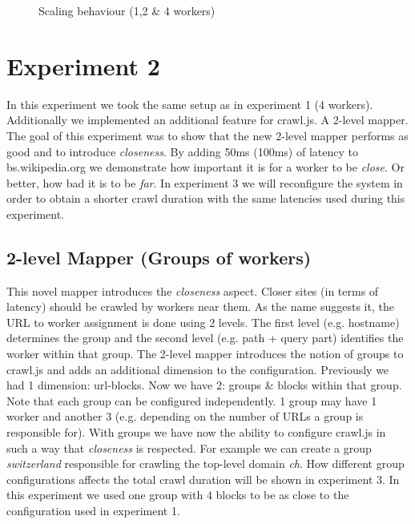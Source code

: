 \newline
\newline
\begin{figure}
\centering
\caption{Scaling behaviour (1,2 \& 4 workers)}
\label{plot:exp_001}
\end{figure}

\section{Experiment 2}

In this experiment we took the same setup as in experiment 1 (4 workers). Additionally we implemented an additional feature for crawl.js. A 2-level mapper. The goal of this experiment was to show that the new 2-level mapper performs as good and to introduce \emph{closeness}. By adding 50ms (100ms) of latency to bs.wikipedia.org we demonstrate how important it is for a worker to be \emph{close}. Or better, how bad it is to be \emph{far}. In experiment 3 we will reconfigure the system in order to obtain a shorter crawl duration with the same latencies used during this experiment.

\subsection{2-level Mapper (Groups of workers)}
This novel mapper introduces the \emph{closeness} aspect. Closer sites (in terms of latency) should be crawled by workers near them. 
\newline
As the name suggests it, the URL to worker assignment is done using 2 levels. The first level (e.g. hostname) determines the group and the second level (e.g. path + query part) identifies the worker within that group. The 2-level mapper introduces the notion of groups to crawl.js and adds an additional dimension to the configuration. Previously we had 1 dimension: url-blocks. Now we have 2: groups \& blocks within that group. Note that each group can be configured independently. 1 group may have 1 worker and another 3 (e.g. depending on the number of URLs a group is responsible for).
\newline
With groups we have now the ability to configure crawl.js in such a way that \emph{closeness} is respected. For example we can create a group \emph{switzerland} responsible for crawling the top-level domain \emph{ch}. How different group configurations affects the total crawl duration will be shown in experiment 3.
\newline
In this experiment we used one group with 4 blocks to be as close to the configuration used in experiment 1.

